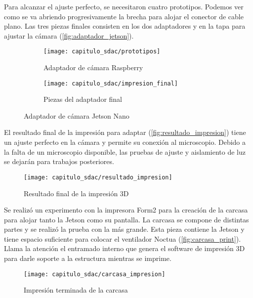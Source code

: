 Para alcanzar el ajuste perfecto, se necesitaron cuatro prototipos. Podemos ver
como se va abriendo progresivamente la brecha para alojar el conector de cable
plano. Las tres piezas finales consisten en los dos adaptadores y en la tapa
para ajustar la cámara (\autoref{fig:adaptador_jetson}).

\begin{figure}[H]
    \centering
    \begin{subfigure}{.5\textwidth}
        \centering
        \texttt{[image: capitulo\_sdac/prototipos]}
        \caption{Adaptador de cámara Raspberry}
    \end{subfigure}%
    \begin{subfigure}{.5\textwidth}
        \centering
        \texttt{[image: capitulo\_sdac/impresion\_final]}
        \caption{Piezas del adaptador final}
    \end{subfigure}
    \caption{Adaptador de cámara Jetson Nano}\label{fig:adaptador_jetson}
\end{figure}

El resultado final de la impresión para adaptar
(\autoref{fig:resultado_impresion}) tiene un ajuste perfecto en la cámara y
permite su conexión al microscopio. Debido a la falta de  un microscopio
disponible, las pruebas de ajuste y aislamiento de luz se dejarán para trabajos
posteriores.

\begin{figure}[H]
    \centering
    \texttt{[image: capitulo\_sdac/resultado\_impresion]}
    \caption{Resultado final de la impresión 3D}\label{fig:resultado_impresion}
\end{figure}

Se realizó un experimento con la impresora Form2 para la creación de la carcasa
para alojar tanto la Jetson como su pantalla. La carcasa se compone de distintas
partes y se realizó la prueba con la más grande. Esta pieza contiene la Jetson y
tiene espacio suficiente para colocar el ventilador Noctua
(\autoref{fig:carcasa_print}). Llama la atención el entramado interno que genera
el software de impresión 3D para darle soporte a la estructura mientras se
imprime.

\begin{figure}[H]
    \centering
    \texttt{[image: capitulo\_sdac/carcasa\_impresion]}
    \caption{Impresión terminada de la carcasa}\label{fig:carcasa_print}
\end{figure}

